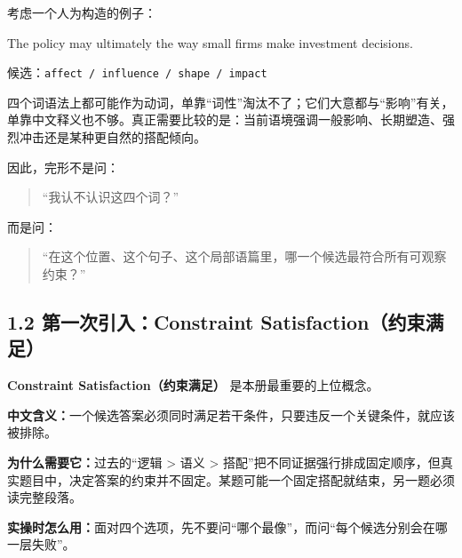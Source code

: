 \documentclass[11pt,a4paper]{ctexart}
\newcommand{\kw}[1]{\textbf{#1}}
\newcommand{\term}[2]{\textbf{#1（#2）}}
\begin{document}
考虑一个人为构造的例子：
\begin{eng}[例 1：同一个空格为什么不能只靠一种技巧]
The policy may ultimately \underline{\hspace{1.5cm}} the way small firms make investment decisions.

候选：\texttt{affect / influence / shape / impact}
\end{eng}
四个词语法上都可能作为动词，单靠“词性”淘汰不了；它们大意都与“影响”有关，单靠中文释义也不够。真正需要比较的是：当前语境强调一般影响、长期塑造、强烈冲击还是某种更自然的搭配倾向。

因此，完形不是问：
\begin{quote}
“我认不认识这四个词？”
\end{quote}
而是问：
\begin{quote}
“在这个位置、这个句子、这个局部语篇里，哪一个候选最符合所有可观察约束？”
\end{quote}

\subsection{1.2 第一次引入：Constraint Satisfaction（约束满足）}
\term{Constraint Satisfaction}{约束满足} 是本册最重要的上位概念。

\kw{中文含义：}一个候选答案必须同时满足若干条件，只要违反一个关键条件，就应该被排除。

\kw{为什么需要它：}过去的“逻辑 > 语义 > 搭配”把不同证据强行排成固定顺序，但真实题目中，决定答案的约束并不固定。某题可能一个固定搭配就结束，另一题必须读完整段落。

\kw{实操时怎么用：}面对四个选项，先不要问“哪个最像”，而问“每个候选分别会在哪一层失败”。
\end{document}

